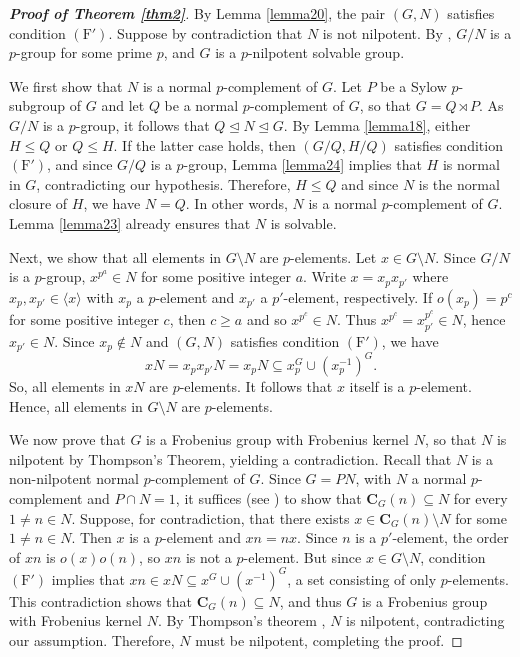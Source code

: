 \documentclass[twoside,a4paper,reqno,11pt]{amsart}
\newcommand{\<}{\langle}
\renewcommand{\>}{\rangle}
\newcommand{\la}{\langle}
\newcommand{\ra}{\rangle}
\newcommand{\leqs}{\leqslant}
\newcommand{\geqs}{\geqslant}
\newcommand{\Fp}{\mathrm{(F')}}
\renewcommand{\leq}{\leqs}
\renewcommand{\geq}{\geqs}
\renewcommand{\:}{\colon}
\theoremstyle{definition}
\begin{document}
\begin{proof}[\textbf{Proof of Theorem \ref{thm2}}]
	By Lemma \ref{lemma20}, the pair $(G,N)$ satisfies condition $\Fp$. Suppose by contradiction that $N$ is not nilpotent.  By \cite[Theorem A]{Akhlaghi-Beltran}, $G/N$ is a $p$-group for some prime $p$, and $G$ is a $p$-nilpotent solvable group. 
	
	We first show that $N$ is a normal $p$-complement of $G$. 
	Let $P$ be a Sylow $p$-subgroup of $G$ and let $Q$ be a normal $p$-complement of $G$, so that $G = Q \rtimes P$. As $G/N$ is a $p$-group, it follows that $Q \unlhd N \unlhd G$. By Lemma \ref{lemma18}, either $H\leq Q$ or $Q\leq H$. If the latter case holds, then $(G/Q,H/Q)$ satisfies condition $\Fp$, and since $G/Q$ is a $p$-group, Lemma \ref{lemma24} implies that  $H$ is normal in $G$, contradicting our hypothesis.  Therefore, $H \leq Q$ and since $N$ is the normal closure of $H$, we have $ N=Q$. In other words,   $N$ is a normal $p$-complement of $G$. Lemma \ref{lemma23} already ensures  that $N$ is solvable.  
	
	Next, we show that all elements in $G\setminus N$ are $p$-elements. Let $x\in G\setminus N$. Since $G/N$ is a $p$-group, $x^{p^a} \in N$ for some positive integer $a$. Write $x = x_px_{p'}$ where $x_p, x_{p'}\in \la x\ra$ with $x_p$ a $p$-element and $x_{p'}$  a $p'$-element, respectively. If $o(x_p) = p^c$ for some positive integer $c$, then $c\geq a$ and so $x^{p^c}\in N$. Thus $x^{p^c} = x_{p'}^{p^c} \in N$, hence $x_{p'}\in N$. Since $x_p\notin N$ and $(G,N)$ satisfies condition $\Fp$, we have  
	\[xN = x_px_{p'}N = x_pN\subseteq x_p^{G} \cup (x_p^{-1})^G.\]
	So, all elements in $xN$ are $p$-elements. It follows that $x$ itself is a $p$-element. Hence, all elements in $G \setminus N$ are $p$-elements. 
	
	We now prove that $G$ is a Frobenius group with Frobenius kernel $N$, so that $N$ is nilpotent by  Thompson's Theorem, yielding a contradiction.  Recall that $N$ is a non-nilpotent normal $p$-complement of $G$.  Since $G=PN$, with $N$ a normal $p$-complement and $P\cap N=1$, it suffices (see \cite[Problem 7.1]{Isaacsbook}) to show that  $\mathbf{C}_G(n) \subseteq N$ for every $1\neq n\in N.$
	Suppose, for contradiction, that there exists $x\in \mathbf{C}_G(n) \setminus N$ for some $1\neq n\in N$. Then $x$ is a $p$-element and $xn=nx$. Since $n$ is a $p'$-element, the order of $xn$ is $o(x)o(n)$, so $xn$ is not a $p$-element. But since $x\in G\setminus N$, condition $\Fp$ implies that $xn\in xN \subseteq x^G \cup (x^{-1})^G$, a set consisting of only $p$-elements. This contradiction shows that $\mathbf{C}_G(n)\subseteq N$, and thus $G$ is a Frobenius group with Frobenius kernel $N$. By Thompson's theorem \cite[Theorem 1]{Thompson}, $N$ is nilpotent, contradicting our assumption. Therefore, $N$ must be nilpotent, completing the proof.   
\end{proof}
\end{document}
